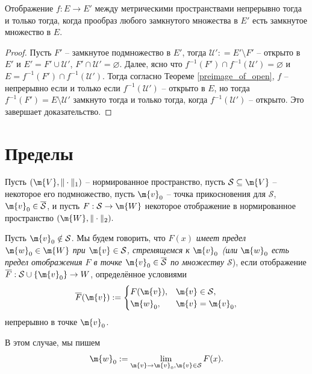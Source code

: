 \begin{lemma}\label{preimage_of_closed}
    Отображение $f:E \to E'$ между метрическими пространствами непрерывно тогда и только тогда, когда прообраз любого замкнутого множества в $E'$ есть замкнутое множество в $E.$
\end{lemma}

\begin{proof}
    Пусть $F'$ -- замкнутое подмножество в $E'$, тогда $\mathscr{U}': = E'\setminus F'$ -- открыто в $E'$ и $E' = F' \cup \mathscr{U}'$, $F' \cap \mathscr{U}' = \varnothing$. Далее, ясно что $f^{-1}(F') \cap f^{-1}(\mathscr{U}') = \varnothing$ и $E = f^{-1}(F') \cap f^{-1}(\mathscr{U}')$. Тогда согласно Теореме \ref{preimage_of_open}, $f$ -- непрерывно если и только если $f^{-1}(\mathscr{U}')$ -- открыто в $E$, но тогда $f^{-1}(F') = E \setminus \mathscr{U}'$ замкнуто тогда и только тогда, когда $f^{-1}(\mathscr{U}')$ -- открыто. Это завершает доказательство.
\end{proof}



\section{Пределы}

Пусть $(\m{V}, \|\cdot\|_1)$ -- нормированное пространство, пусть $\mathcal{S} \subseteq \m{V}$ -- некоторое его подмножество, пусть $\m{v}_0$ -- точка прикосновения для $\mathcal{S}$, \ie $\m{v}_0 \in \overline{\mathcal{S}}$, и пусть $F:\mathcal{S} \to \m{W}$ некоторое отображение в нормированное пространство $(\m{W}, \|\cdot\|_2).$

\begin{definition}\label{the_main_def_of_limit}
Пусть $\m{v}_0 \notin \mathcal{S}$. Мы будем говорить, что $F(x)$ \textit{имеет предел $\m{w}_0 \in \m{W}$ при $\m{v} \in \mathcal{S}$, стремящемся к $\m{v}_0$ (или $\m{w}_0$ есть предел отображения $F$ в точке $\m{v}_0\in \overline{\mathcal{S}}$ по множеству $\mathcal{S}$}), если отображение $\overline{F}:\mathcal{S} \cup \{\m{v}_0\} \to W$, определённое условиями
    \[
     \overline{F}(\m{v}) := \begin{cases}
         F(\m{v}), & \m{v} \in \mathcal{S}, \\
         \m{w}_0, & \m{v} = \m{v}_0,
     \end{cases}
    \]
    непрерывно в точке $\m{v}_0$.
\end{definition}

В этом случае, мы пишем
\[
 \m{w}_0 := \lim_{\m{v}\to \m{v}_0, \m{v} \in \mathcal{S}} F(x).
\]

